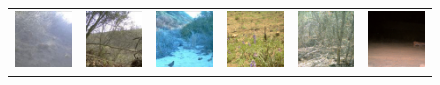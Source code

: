 \begin{figure}[htp!]
\begin{tabularx}{.7\textwidth}{Y Y Y !{\space} Y Y Y}
        \includegraphics{gfx/unconditional-diffusion-sampling-caltech-qual/rgb_585dab96-23d2-11e8-a6a3-ec086b02610b.jpg} & \includegraphics{gfx/unconditional-diffusion-sampling-caltech-qual/rgb_585f4d99-23d2-11e8-a6a3-ec086b02610b.jpg} & \includegraphics{gfx/unconditional-diffusion-sampling-caltech-qual/rgb_585f4fbd-23d2-11e8-a6a3-ec086b02610b.jpg} & \includegraphics{gfx/unconditional-diffusion-sampling-caltech-qual/diffusion_00005.png} & \includegraphics{gfx/unconditional-diffusion-sampling-caltech-qual/diffusion_00004.png} & \includegraphics{gfx/unconditional-diffusion-sampling-caltech-qual/diffusion_00003.png} \\

\end{tabularx}
\end{figure}
